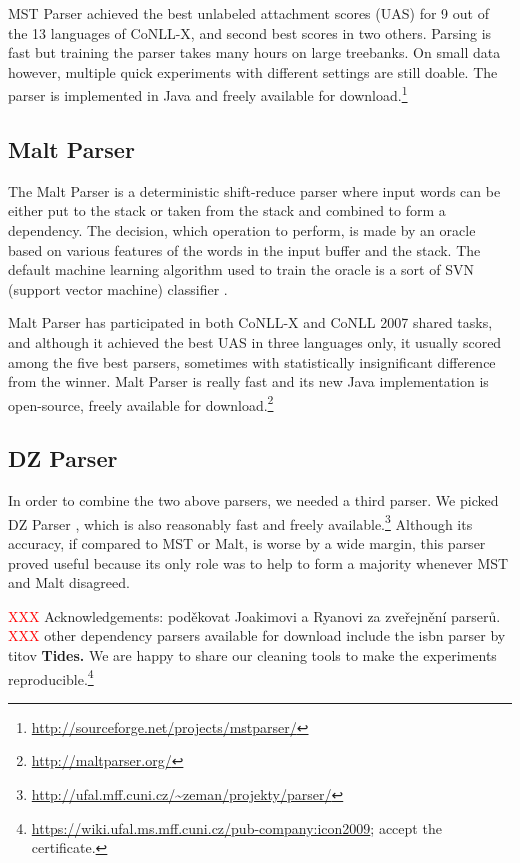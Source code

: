 \documentclass[11pt]{article}
\newcommand{\XXX}{\textcolor{red}{XXX }} %
\def\microsection#1{{\bf #1.}}
\begin{document}
MST Parser achieved the best unlabeled attachment scores (UAS) for 9 out of the 13 languages of CoNLL-X, and second best scores in two others. Parsing is fast but training the parser takes many hours on large treebanks. On small data however, multiple quick experiments with different settings are still doable. The parser is implemented in Java and freely available for download.\footnote{\url{http://sourceforge.net/projects/mstparser/}}

\subsection{Malt Parser}
\label{sec:malt}
The Malt Parser  \citep{malt} is a deterministic shift-reduce parser where input words can be either put to the stack or taken from the stack and combined to form a dependency. The decision, which operation to perform, is made by an oracle based on various features of the words in the input buffer and the stack. The default machine learning algorithm used to train the oracle is a sort of SVN (support vector machine) classifier \citep{svm}.

Malt Parser has participated in both CoNLL-X and CoNLL 2007 shared tasks, and although it achieved the best UAS in three languages only, it usually scored among the five best parsers, sometimes with statistically insignificant difference from the winner. Malt Parser is really fast and its new Java implementation is open-source, freely available for download.\footnote{\url{http://maltparser.org/}}

\subsection{DZ Parser}
\label{sec:dz}
In order to combine the two above parsers, we needed a third parser. We picked DZ Parser \citep{dzparser}, which is also reasonably fast and freely available.\footnote{\url{http://ufal.mff.cuni.cz/~zeman/projekty/parser/}} Although its accuracy, if compared to MST or Malt, is worse by a wide margin, this parser proved useful because its only role was to help to form a majority whenever MST and Malt disagreed.

\XXX Acknowledgements: poděkovat Joakimovi a Ryanovi za zveřejnění parserů.
\XXX other dependency parsers available for download include the isbn parser by titov
\microsection{Tides}
\label{sec:tides}
We are happy
to share our cleaning tools to make the experiments reproducible.\footnote{\url{https://wiki.ufal.ms.mff.cuni.cz/pub-company:icon2009}; accept the certificate.}
\end{document}
